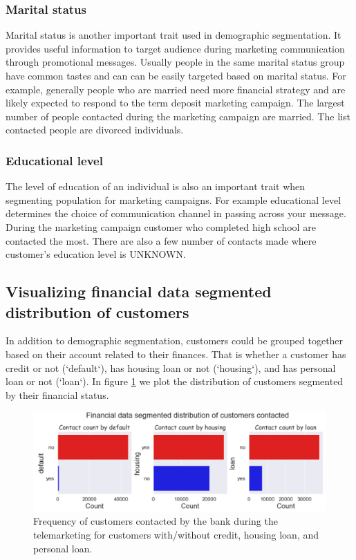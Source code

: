 \subsubsection*{Marital status}
Marital status is another important trait used in demographic segmentation. It provides useful information to target audience during marketing communication through promotional messages. Usually people in the same marital status group have common tastes and can can be easily targeted based on marital status. For example, generally people who are married need more financial strategy and are likely expected to respond to the term deposit marketing campaign. The largest number of people contacted during the marketing campaign are married. The list contacted people are divorced individuals.

\subsubsection*{Educational level}

The level of education of an individual is also an important trait when segmenting population for marketing campaigns. For example educational level determines the choice of communication channel in passing across your message. During the marketing campaign customer who completed high school are contacted the most. There are also a few number of contacts made where customer's education level is UNKNOWN.

\subsection{Visualizing financial data segmented distribution of customers}
In addition to demographic segmentation, customers could be grouped together based on their account related to their finances. That is whether a customer has credit or not (`default`), has housing loan or not (`housing`), and has personal loan or not (`loan`).  In figure \ref{fig:cat_financial_count} we plot the distribution of customers segmented by their financial status.   


\begin{figure}[tbh]
\centering
\includegraphics[width = 1.0\hsize]{./resources/img/fig_cat_financial_count.png}
\caption{Frequency of customers contacted by the bank during the telemarketing for customers with/without credit, housing loan, and personal loan.} 
\label{fig:cat_financial_count}
\end{figure}

